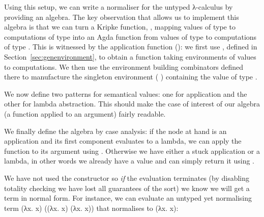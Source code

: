 \begin{agdasnippet}
\end{agdasnippet}

Using this setup, we can write a normaliser for the untyped λ-calculus
by providing an algebra. The key observation that allows us to implement
this algebra is that we can turn a Kripke function, , mapping values
of type  to computations of type  into an Agda function from
values of type  to computations of type . This is witnessed
by the application function (\AF{\_\$\$\_}):
we first use , defined in Section~\ref{sec:genenvironment}, to obtain
a function taking environments of values to computations. We then use the environment building
combinators defined there to manufacture the singleton
environment {(  )} containing the value  of type
.

\begin{agdasnippet}
\end{agdasnippet}

We now define two patterns for semantical values: one for application and
the other for lambda abstraction. This should make the case of interest of
our algebra (a function applied to an argument) fairly readable.

\begin{agdasnippet}
\end{agdasnippet}

We finally define the algebra by case analysis: if the node at hand is an
application and its first component evaluates to a lambda, we can apply
the function to its argument using \AF{\_\$\$\_}. Otherwise we have either a
stuck application or a lambda, in other words we already have a value and can
simply return it using .

\begin{agdasnippet}
\end{agdasnippet}

We have not used the  constructor so \emph{if} the evaluation terminates
(by disabling totality checking we have lost all guarantees of the sort) we know
we will get a term in normal form. For instance, we can evaluate an untyped yet normalising
term {(λx. x) ((λx. x) (λx. x))} that normalises to {(λx. x)}:

\begin{agdasnippet}
\end{agdasnippet}
